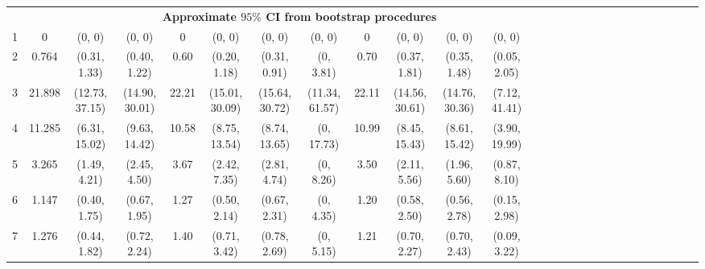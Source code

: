 \documentclass[a4paper 12pt]{article}
\numberwithin{equation}{section}
\begin{document}
\begin{tiny}
\begin{table}[h!]
\begin{tabular}{ccccccccccccccccccccccccccc}
 &&& \multicolumn{8}{c}{\bf Approximate $95 \%$ CI from bootstrap procedures} \\[1.5ex]
1  & 0      &(0, 0)         & (0, 0)        & 0     &(0, 0)         &  (0, 0)         & (0, 0)        & 0     &(0, 0)        & (0, 0)         & (0, 0)   \\[1ex]
2  & 0.764  &(0.31, 1.33)   & (0.40, 1.22)  & 0.60  &(0.20, 1.18)   &  (0.31, 0.91)   & (0, 3.81)     & 0.70  &(0.37, 1.81)  & (0.35, 1.48)   & (0.05, 2.05) \\[1ex]
3  & 21.898 &(12.73, 37.15) & (14.90, 30.01)& 22.21 &(15.01, 30.09) &  (15.64, 30.72) & (11.34, 61.57)& 22.11 &(14.56, 30.61)& (14.76, 30.36) & (7.12, 41.41)\\[1ex]
4  & 11.285 &(6.31, 15.02)  & (9.63, 14.42) & 10.58 &(8.75, 13.54)  &  (8.74, 13.65)  & (0, 17.73)    & 10.99 &(8.45, 15.43) & (8.61, 15.42)  & (3.90, 19.99)\\[1ex]
5  & 3.265  &(1.49, 4.21)   & (2.45, 4.50)  & 3.67  &(2.42, 7.35)   &  (2.81, 4.74)   & (0, 8.26)     & 3.50  &(2.11, 5.56)  & (1.96, 5.60)   & (0.87, 8.10)\\[1ex]
6  & 1.147  &(0.40, 1.75)   & (0.67, 1.95)  & 1.27  &(0.50, 2.14)   &  (0.67, 2.31)   & (0, 4.35)     & 1.20  & (0.58, 2.50) & (0.56, 2.78)   & (0.15, 2.98)\\[1ex]
7  & 1.276  &(0.44, 1.82)   & (0.72, 2.24)  & 1.40  &(0.71, 3.42)   &  (0.78, 2.69)   & (0, 5.15)     & 1.21  &(0.70, 2.27)  & (0.70, 2.43)   & (0.09, 3.22) \\[1ex]
\hline
\end{tabular}
\end{table}
\end{tiny}

\clearpage
\end{document}

